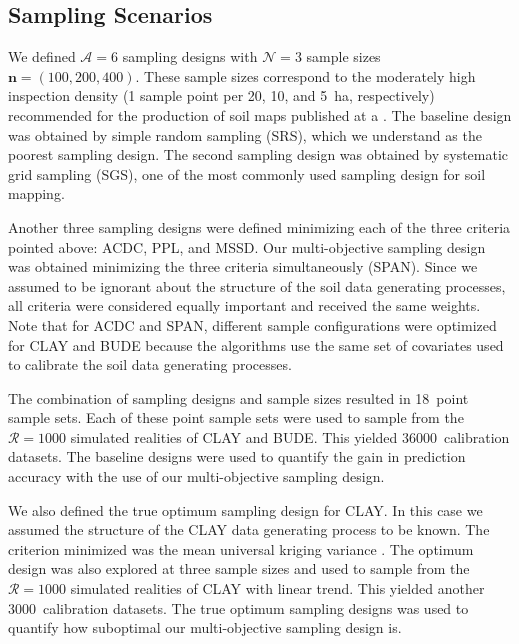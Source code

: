 
\subsection{Sampling Scenarios}

We defined $\mathcal{A} = 6$ sampling designs with $\mathcal{N} = 3$ sample sizes $\boldsymbol{n} = (100, 200, 
400)$. These sample sizes correspond to the moderately high inspection density (1 sample point per 20, 10, and 
\SI{5}{\hectare}, respectively) recommended for the production of soil maps published at a  
\cite{Rossiter2000}. The baseline design was obtained by simple random sampling (SRS), which we understand 
as the poorest sampling design. The second sampling design was obtained by systematic grid sampling (SGS), one 
of the most commonly used sampling design for soil mapping.

Another three sampling designs were defined minimizing each of the three criteria pointed above: ACDC, PPL, 
and MSSD. Our multi-objective sampling design was obtained minimizing the three criteria simultaneously 
(SPAN). Since we assumed to be ignorant about the structure of the soil data generating processes, all criteria 
were considered equally important and received the same weights. Note that for ACDC and SPAN, different sample 
configurations were optimized for CLAY and BUDE because the algorithms use the same set of covariates used to 
calibrate the soil data generating processes.

The combination of sampling designs and sample sizes resulted in 18~point sample sets. Each of these point 
sample sets were used to sample from the $\mathcal{R} = 1000$ simulated realities of CLAY and BUDE. This 
yielded \num{36000}~calibration datasets. The baseline designs were used to quantify the gain in prediction 
accuracy with the use of our multi-objective sampling design.

We also defined the true optimum sampling design for CLAY. In this case we assumed the structure of the CLAY 
data generating process to be known. The criterion minimized was the mean universal kriging variance 
\cite{BrusEtAl2007a}. The optimum design was also explored at three sample sizes and used to sample from the 
$\mathcal{R} = 1000$ simulated realities of CLAY with linear trend. This yielded another 3000~calibration 
datasets. The true optimum sampling designs was used to quantify how suboptimal our multi-objective sampling 
design is.

